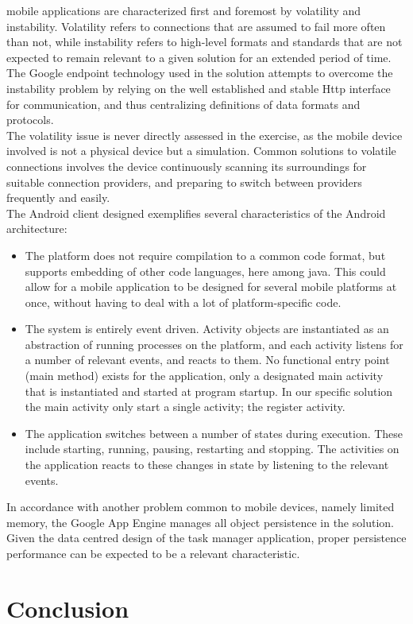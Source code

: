 mobile applications are characterized first and foremost by volatility and instability. Volatility refers to connections that are assumed to fail more often than not, while instability refers to high-level formats and standards that are not expected to remain relevant to a given solution for an extended period of time. The Google endpoint technology used in the solution attempts to overcome the instability problem by relying on the well established and stable Http interface for communication, and thus centralizing definitions of data formats and protocols. \\
The volatility issue is never directly assessed in the exercise, as the mobile device involved is not a physical device but a simulation. Common solutions to volatile connections involves the device continuously scanning its surroundings for suitable connection providers, and preparing to switch between providers frequently and easily.\\
The Android client designed exemplifies several characteristics of the Android architecture:
\begin{itemize}
	\item The platform does not require compilation to a common code format, but supports embedding of other code languages, here among java. This could allow for a mobile application to be designed for several mobile platforms at once, without having to deal with a lot of platform-specific code.
	\item The system is entirely event driven. Activity objects are instantiated as an abstraction of running processes on the platform, and each activity listens for a number of relevant events, and reacts to them. No functional entry point (main method) exists for the application, only a designated main activity that is instantiated and started at program startup. In our specific solution the main activity only start a single activity; the register activity.
	\item The application switches between a number of states during execution. These include starting, running, pausing, restarting and stopping. The activities on the application reacts to these changes in state by listening to the relevant events.
\end{itemize}
In accordance with another problem common to mobile devices, namely limited memory, the Google App Engine manages all  object persistence in the solution. Given the data centred design of the task manager application, proper persistence performance can be expected to be a relevant characteristic.

\section{Conclusion}